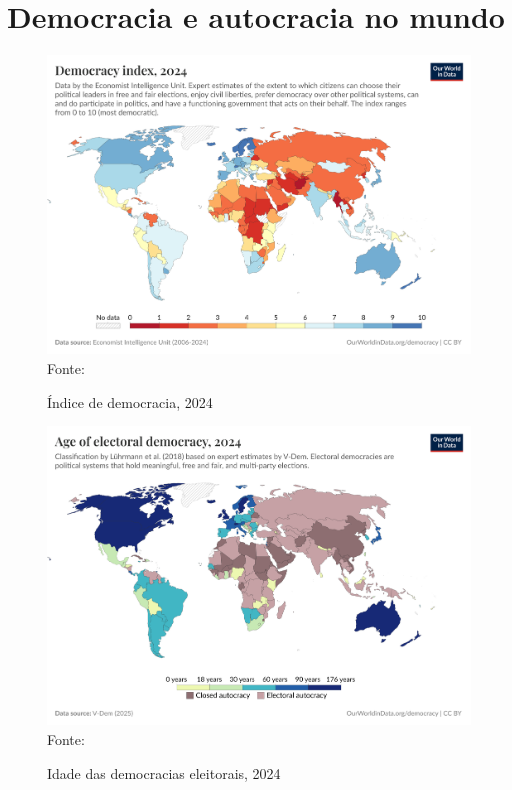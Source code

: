\section{Democracia e autocracia no mundo}

\begin{figure}[ht]
    \centering
    \caption{Índice de democracia, 2024}
    \includegraphics[width=1\linewidth]{figuras/democracia/democracy-index-eiu.png}
    \label{fig:democracy-index-eiu}
    \footnotesize{Fonte: \cite{electoral_democracy_eiu}}
\end{figure}

\begin{figure}[ht]
    \centering
    \caption{Idade das democracias eleitorais, 2024}
    \includegraphics[width=1\linewidth]{figuras/democracia/age-of-electoral-democracy.png}
    \label{fig:age-of-electoral-democracy}
    \footnotesize{Fonte: \cite{age_electoral_democracy}}
\end{figure}


